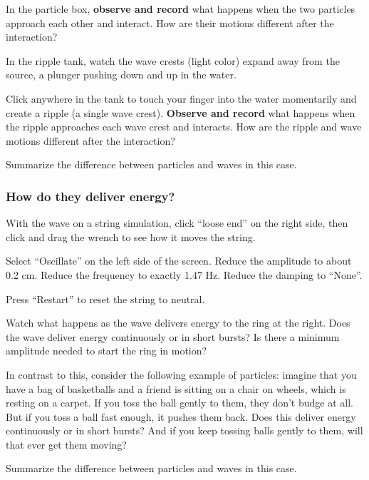 \begin{steps}
	\item In the particle box, \textbf{observe and record} what happens when the two particles approach each other and interact. How are their motions different after the interaction?
	
	\item In the ripple tank, watch the wave crests (light color) expand away from the source, a plunger pushing down and up in the water.
	
	\item Click anywhere in the tank to touch your finger into the water momentarily and create a ripple (a single wave crest). \textbf{Observe and record} what happens when the ripple approaches each wave crest and interacts. How are the ripple and wave motions different after the interaction?

	\item Summarize the difference between particles and waves in this case.

\end{steps}

\subsubsection{How do they deliver energy?}

\begin{steps}
	\item With the wave on a string simulation, click ``loose end'' on the right side, then click and drag the wrench to see how it moves the string.
	
	\item Select ``Oscillate'' on the left side of the screen. Reduce the amplitude to about 0.2 cm. Reduce the frequency to exactly 1.47 Hz. Reduce the damping to ``None''.
	
	\item Press ``Restart'' to reset the string to neutral.
	
	\item Watch what happens as the wave delivers energy to the ring at the right. Does the wave deliver energy continuously or in short bursts? Is there a minimum amplitude needed to start the ring in motion?
	
	\item In contrast to this, consider the following example of particles: imagine that you have a bag of basketballs and a friend is sitting on a chair on wheels, which is resting on a carpet. If you toss the ball gently to them, they don't budge at all. But if you toss a ball fast enough, it pushes them back. Does this deliver energy continuously or in short bursts? And if you keep tossing balls gently to them, will that ever get them moving?

	\item Summarize the difference between particles and waves in this case.

\end{steps}

